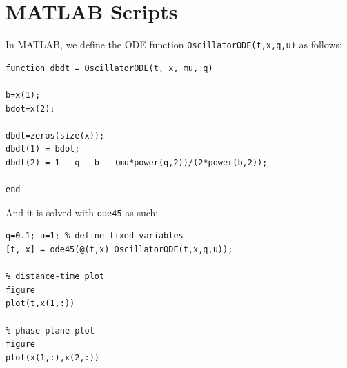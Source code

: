 \documentclass{article}
\begin{document}










\appendix

\section{MATLAB Scripts}

In MATLAB, we define the ODE function \texttt{OscillatorODE(t,x,q,u)} as follows:


\begin{verbatim}
function dbdt = OscillatorODE(t, x, mu, q)

b=x(1);
bdot=x(2);

dbdt=zeros(size(x));
dbdt(1) = bdot;
dbdt(2) = 1 - q - b - (mu*power(q,2))/(2*power(b,2));

end
\end{verbatim}

And it is solved with \texttt{ode45} as such:

\begin{verbatim}
q=0.1; u=1; % define fixed variables
[t, x] = ode45(@(t,x) OscillatorODE(t,x,q,u));

% distance-time plot
figure
plot(t,x(1,:))

% phase-plane plot
figure
plot(x(1,:),x(2,:))
\end{verbatim}
\end{document}
